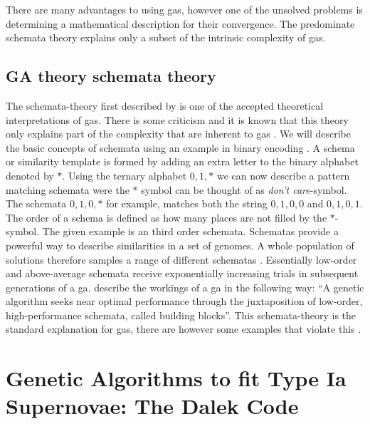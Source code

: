 There are many advantages to using \glspl{ga}, however one of the unsolved problems is determining a mathematical description for their convergence. The predominate schemata theory explains only a subset of the intrinsic complexity of \glspl{ga}.

\subsection{GA theory schemata theory}

The schemata-theory first described by \cite{holland1975} is one of the accepted theoretical interpretations of \glspl{ga}. There is some criticism and it is known that this theory only explains part of the complexity that are inherent to \glspl{ga} \citep[see ][ and references therein]{Whitley94agenetic}. We will describe the basic concepts of schemata using an example in binary encoding \citep[notation adapted from ][]{citeulike:125978}. A schema or similarity template is formed by adding an extra letter to the binary alphabet denoted by $*$. Using the ternary alphabet ${0, 1, *}$ we can now describe a pattern matching schemata were the $*$ symbol can be thought of as \textit{don't care}-symbol. The schemata ${0, 1, 0, *}$ for example, matches both the string ${0, 1, 0, 0}$ and ${0, 1, 0, 1}$. The order of a schema is defined as how many places are not filled by the $*$-symbol. The given example is an third order schemata. Schematas provide a powerful way to describe similarities in a set of genomes. 
A whole population of solutions therefore samples a range of different schematas . Essentially low-order and above-average schemata receive exponentially increasing trials in subsequent generations of a \gls{ga}. \citet{Michalewicz:1994:GAD:184675} describe the workings of a \gls{ga} in the following way: ``A genetic algorithm seeks near optimal performance through the juxtaposition of low-order, high-performance schemata, called building blocks''.
This schemata-theory is the standard explanation for \glspl{ga}, there are however some examples that violate this \citep[see chapter 3 of][for some examples]{Michalewicz:1994:GAD:184675}.


\section{Genetic Algorithms to fit Type Ia Supernovae: The Dalek Code}
\label{sec:geneticdalek}

